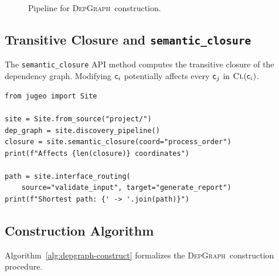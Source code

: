 \documentclass[11pt]{article}
\newcommand{\DepGraph}{\textsc{DepGraph}}
\newcommand{\FormalSite}{\texttt{formal\_core\_site}}
\newcommand{\SemClosure}{\texttt{semantic\_closure}}
\begin{document}
\begin{figure}[H]
\centering
{}
\caption{Pipeline for \DepGraph\ construction.}
\label{fig:depgraph-pipeline}
\end{figure}

\subsection{Transitive Closure and \SemClosure}
The \texttt{semantic\_closure} API method computes the transitive closure of
the dependency graph.  Modifying $\mathsf{c}_i$ potentially affects every
$\mathsf{c}_j$ in $\textsc{Cl}(\mathsf{c}_i)$.

\begin{lstlisting}[style=jugeo-python]
from jugeo import Site

site = Site.from_source("project/")
dep_graph = site.discovery_pipeline()
closure = site.semantic_closure(coord="process_order")
print(f"Affects {len(closure)} coordinates")

path = site.interface_routing(
    source="validate_input", target="generate_report")
print(f"Shortest path: {' -> '.join(path)}")
\end{lstlisting}

\subsection{Construction Algorithm}\label{sec:dep-alg-formal}

Algorithm~\ref{alg:depgraph-construct} formalizes the \DepGraph\
construction procedure.
\end{document}
